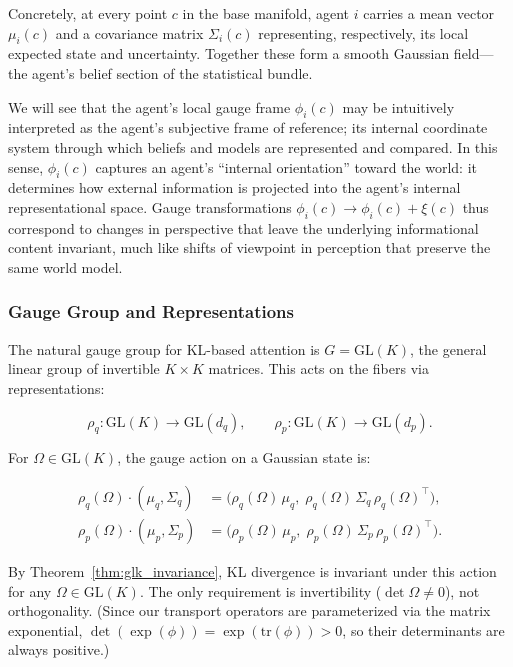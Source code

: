 \documentclass[twoside,11pt]{article}
\begin{document}
Concretely, at every point $c$ in the base manifold, agent $i$ carries a mean vector $\mu_i(c)$ and a covariance matrix $\Sigma_i(c)$ representing, respectively, its local expected state and uncertainty. Together these form a smooth Gaussian field—the agent’s belief section of the statistical bundle. 

We will see that the agent's local gauge frame $\phi_i(c)$ may be intuitively interpreted as the agent's subjective frame of reference; its internal coordinate system through which beliefs and models are represented and compared. In this sense, $\phi_i(c)$ captures an agent’s “internal orientation” toward the world: it determines how external information is projected into the agent’s internal representational space. Gauge transformations $\phi_i(c) \to \phi_i(c) + \xi(c)$ thus correspond to changes in perspective that leave the underlying informational content invariant, much like shifts of viewpoint in perception that preserve the same world model. 



\subsubsection{Gauge Group and Representations}
The natural gauge group for KL-based attention is $G = \mathrm{GL}(K)$, the general linear group of invertible $K \times K$ matrices. This acts on the fibers via representations:

\begin{equation}
\rho_q: \mathrm{GL}(K) \to \mathrm{GL}(d_q),
\qquad
\rho_p: \mathrm{GL}(K) \to \mathrm{GL}(d_p).
\label{eq:representations}
\end{equation}

For $\Omega \in \mathrm{GL}(K)$, the gauge action on a Gaussian state is:

\begin{equation}
\boxed{
\begin{aligned}
\rho_q(\Omega) \cdot (\mu_q, \Sigma_q)
&= \big(\rho_q(\Omega)\,\mu_q,\;
\rho_q(\Omega)\,\Sigma_q\,\rho_q(\Omega)^\top\big),\\
\rho_p(\Omega) \cdot (\mu_p, \Sigma_p)
&= \big(\rho_p(\Omega)\,\mu_p,\;
\rho_p(\Omega)\,\Sigma_p\,\rho_p(\Omega)^\top\big).
\end{aligned}
}
\label{eq:gauge_action_gaussians}
\end{equation}

By Theorem~\ref{thm:glk_invariance}, KL divergence is invariant under this action for any $\Omega \in \mathrm{GL}(K)$. The only requirement is invertibility ($\det \Omega \neq 0$), not orthogonality. (Since our transport operators are parameterized via the matrix exponential, $\det(\exp(\phi)) = \exp(\mathrm{tr}(\phi)) > 0$, so their determinants are always positive.)
\end{document}
